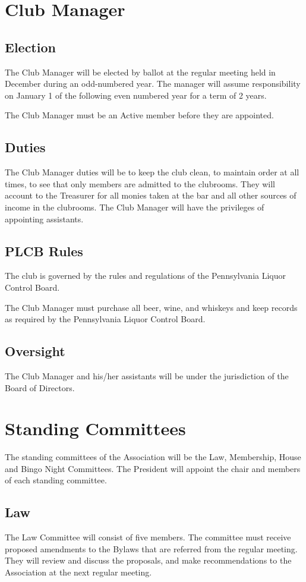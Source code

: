 \documentclass[12pt,letterpaper]{article}
\begin{document}
\section{Club Manager}

\subsection{Election}
The Club Manager will be elected by ballot at the regular meeting held in December during an odd-numbered year. The manager will assume responsibility on January 1 of the following even numbered year for a term of 2 years.

The Club Manager must be an Active member before they are appointed. 

\subsection{Duties}
The Club Manager duties will be to keep the club clean, to maintain order at all times, to see that only members are admitted to the clubrooms. They will account to the Treasurer for all monies taken at the bar and all other sources of income in the clubrooms. The Club Manager will have the privileges of appointing assistants.

\subsection{PLCB Rules}
The club is governed by the rules and regulations of the Pennsylvania Liquor Control Board.

The Club Manager must purchase all beer, wine, and whiskeys and keep records as required by the Pennsylvania Liquor Control Board.

\subsection{Oversight}
The Club Manager and his/her assistants will be under the jurisdiction of the Board of Directors. 

\section{Standing Committees}
The standing committees of the Association will be the Law, Membership, House and Bingo Night Committees. The President will appoint the chair and members of each standing committee. 

\subsection{Law}
The Law Committee will consist of five members. The committee must receive proposed amendments to the Bylaws that are referred from the regular meeting. They will review and discuss the proposals, and make recommendations to the Association at the next regular meeting.
\end{document}
